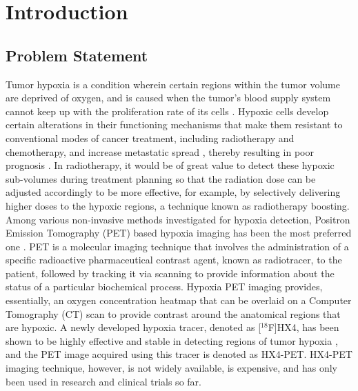 \chapter{Introduction}
\label{Introduction}



\section{Problem Statement}
Tumor hypoxia is a condition wherein certain regions within the tumor volume are deprived of oxygen, and is caused when the tumor's blood supply system cannot keep up with the proliferation rate of its cells \cite{hockel2001tumor}. Hypoxic cells develop certain alterations in their functioning mechanisms that make them resistant to conventional modes of cancer treatment, including radiotherapy and chemotherapy, and increase metastatic spread \cite{muz2015role}, thereby resulting in poor prognosis \cite{vaupel2007hypoxia}. In radiotherapy, it would be of great value to detect these hypoxic sub-volumes during treatment planning so that the radiation dose can be adjusted accordingly to be more effective, for example, by selectively delivering higher doses to the hypoxic regions, a technique known as radiotherapy boosting. Among various non-invasive methods investigated for hypoxia detection, Positron Emission Tomography (PET) based hypoxia imaging has been the most preferred one \cite{fleming2015imaging}. PET is a molecular imaging technique that involves the administration of a specific radioactive pharmaceutical contrast agent, known as radiotracer, to the patient, followed by tracking it via scanning to provide information about the status of a particular biochemical process. Hypoxia PET imaging provides, essentially, an oxygen concentration heatmap that can be overlaid on a Computer Tomography (CT) scan to provide contrast around the anatomical regions that are hypoxic. A newly developed hypoxia tracer, denoted as [$^{18}$F]HX4, has been shown to be highly effective and stable in detecting regions of tumor hypoxia \cite{sanduleanu2020hypoxia}, and the PET image acquired using this tracer is denoted as HX4-PET. HX4-PET imaging technique, however, is not widely available, is expensive, and has only been used in research and clinical trials so far. 

